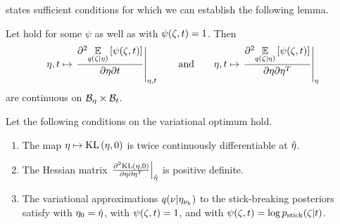  states sufficient conditions for which we can
establish the following lemma.


\begin{lem}
%
Let  hold for some $\psi$ as well as with $\psi(\zeta,
t) = 1$.  Then
%
\begin{align*}
%
\eta, \t \mapsto \fracat{\partial^2
\expect{\q(\zeta \vert \eta)} {\psi(\zeta, \t)}}{\partial \eta \partial
\t}{\eta, \t}
%
\quad\mathand\quad
%
\eta, \t \mapsto  \fracat{\partial^2
\expect{\q(\zeta \vert \eta)} {\psi(\zeta, \t)}}{\partial \eta \partial
\eta^T}{\eta}
%
\end{align*}
%
are continuous on $\mathcal{B}_\eta \times \mathcal{B}_t$.
%
\end{lem}


\begin{assu}
%
Let the following conditions on the variational optimum hold.
%
\begin{enumerate}
%
    \item {} The map $\eta \mapsto \mathrm{KL}\left(\eta, 0\right)$ is twice
    continuously differentiable at $\hat\eta$.

    \item{} The Hessian matrix $\left.\frac{\partial^2 \mathrm{KL}\left(\eta,
    0\right)}{\partial \eta \partial \eta^T}\right\vert_{\hat\eta}$ is positive definite.

    \item{} The variational approximations $q(\nu
    \vert \eta_{\nu_{k}})$ to the stick-breaking posteriors satisfy
     with $\eta_0 = \hat\eta$, with $\psi(\zeta, t) = 1$,
    and with $\psi(\zeta, t) = \log p_{\mathrm{stick}}(\zeta \vert t)$.
%
\end{enumerate}
%
\end{assu}

